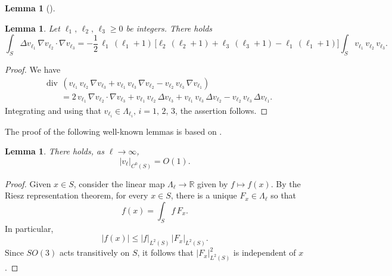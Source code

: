 \documentclass[11pt]{amsart}
\newtheorem{lemma}[theorem]{Lemma}
\theoremstyle {definition}
\newcommand{\RR}{\mathbb{R}}
\begin{document}
\begin{appendices}
\begin{lemma}[{\cite[\S8]{CourantHilbert}}]
\end{lemma}
\begin{lemma}  \label{triple product 1}
	Let $\ell_1,\,\ell_2,\,\ell_3\geq 0$ be integers. There holds
	$$
	\int_S \Delta v_{\ell_1}\,\nabla v_{\ell_2}\cdot \nabla v_{\ell_3}=-
	\frac12\,\ell_1\,(\ell_1+1)\,\big[\ell_2\,(\ell_2+1)+\ell_3\,(\ell_3+1)-\ell_1\,(\ell_1+1)\big]
	\int_S v_{\ell_1}\,v_{\ell_2}\,v_{\ell_3}.
	$$
\end{lemma} 
\begin{proof} We have
	\begin{align*} 
&	\operatorname{div}\,(v_{\ell_1}\,v_{\ell_2}\,\nabla v_{\ell_3}+v_{\ell_1}\,v_{\ell_3}\,\nabla v_{\ell_2}-v_{\ell_2}\,v_{\ell_3}\,\nabla v_{\ell_1})\\&\qquad =2\,v_{\ell_1}\,\nabla v_{\ell_2}\cdot \nabla v_{\ell_3}+v_{\ell_1}\,v_{\ell_2}\,\Delta v_{\ell_3}+v_{\ell_1}\,v_{\ell_3}\,\Delta v_{\ell_2}-v_{\ell_2}\,v_{\ell_3}\,\Delta v_{\ell_1}.
	\end{align*} 
Integrating and using that $v_{\ell_i}\in \Lambda_{\ell_i},\,i=1,\,2,\,3$, the assertion follows.
\end{proof}
The proof of the following well-known lemmas is  based on \cite[Chapter IV, Lemma 2.8 and Corollary 2.9]{SteinWeiss}. %
\begin{lemma} \label{pointwise estimate 0}
	There holds, as $\ell\to\infty$,
	$$
	|v_\ell|_{C^0(S)}=O(1).
	$$
\end{lemma}
\begin{proof}
	Given $x \in S$, consider the linear map $\Lambda_\ell \to \RR$ given by $f\mapsto f(x)$. By the Riesz representation theorem, for every $x\in S$, there is a unique $F_x \in \Lambda_\ell$ so that $$f(x) = \int_S f\,F_x. $$ In particular,
	\[
	|f(x)| \leq | f|_{L^2(S)}\,| F_x |_{L^2(S)}. 
	\]
	Since $SO(3)$ acts transitively on $S$, it follows that  $ | F_x|_{L^2(S)}^2$ is independent of $x$.
	

\end{proof}
\end{appendices}
\end{document}

